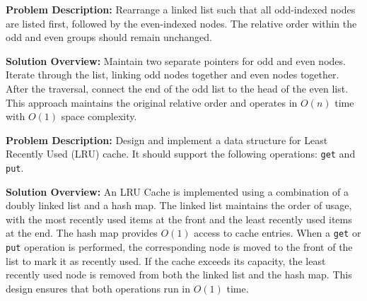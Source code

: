 
\textbf{Problem Description:}  
Rearrange a linked list such that all odd-indexed nodes are listed first, followed by the even-indexed nodes. The relative order within the odd and even groups should remain unchanged.

\textbf{Solution Overview:}  
Maintain two separate pointers for odd and even nodes. Iterate through the list, linking odd nodes together and even nodes together. After the traversal, connect the end of the odd list to the head of the even list. This approach maintains the original relative order and operates in \(O(n)\) time with \(O(1)\) space complexity.


\textbf{Problem Description:}  
Design and implement a data structure for Least Recently Used (LRU) cache. It should support the following operations: \texttt{get} and \texttt{put}.

\textbf{Solution Overview:}  
An LRU Cache is implemented using a combination of a doubly linked list and a hash map. The linked list maintains the order of usage, with the most recently used items at the front and the least recently used items at the end. The hash map provides \(O(1)\) access to cache entries. When a \texttt{get} or \texttt{put} operation is performed, the corresponding node is moved to the front of the list to mark it as recently used. If the cache exceeds its capacity, the least recently used node is removed from both the linked list and the hash map. This design ensures that both operations run in \(O(1)\) time.

